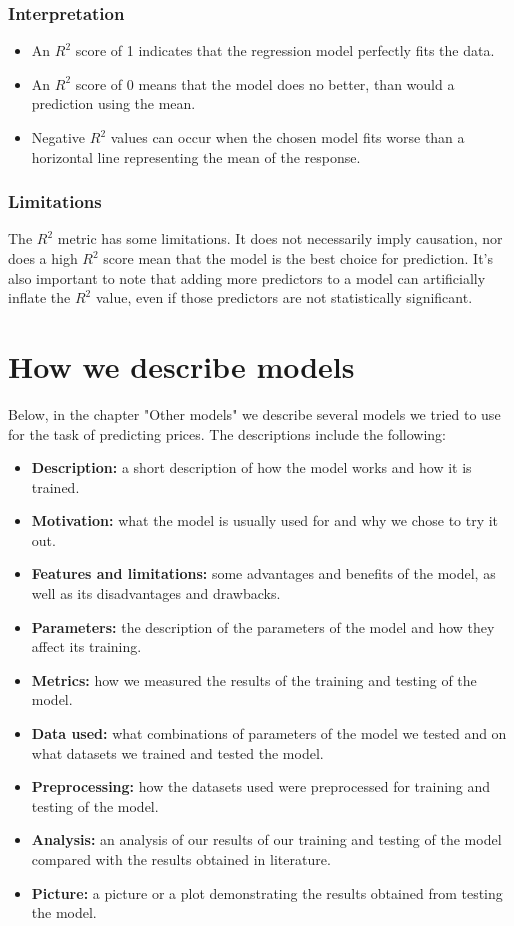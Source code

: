 \subsubsection{Interpretation}
\begin{itemize}
	\item An \(R^2\) score of 1 indicates that the regression model perfectly fits the data.
	\item An \(R^2\) score of 0 means that the model does no better, than would a prediction using the mean.
	\item Negative \(R^2\) values can occur when the chosen model fits worse than a horizontal line representing the mean of the response.
\end{itemize}

\subsubsection{Limitations}
The \(R^2\) metric has some limitations. It does not necessarily imply causation, nor does a high \(R^2\) score mean that the model is the best choice for prediction. It's also important to note that adding more predictors to a model can artificially inflate the \(R^2\) value, even if those predictors are not statistically significant.


\section{How we describe models}
Below, in the chapter "Other models" we describe several models we tried to use for the task of predicting prices. The descriptions include the following:
\begin{itemize}
	\item \textbf{Description:} a short description of how the model works and how it is trained.
	\item \textbf{Motivation:} what the model is usually used for and why we chose to try it out.
	\item \textbf{Features and limitations:} some advantages and benefits of the model, as well as its disadvantages and drawbacks.
	\item \textbf{Parameters:} the description of the parameters of the model and how they affect its training.
	\item \textbf{Metrics:} how we measured the results of the training and testing of the model.
	\item \textbf{Data used:} what combinations of parameters of the model we tested and on what datasets we trained and tested the model.
	\item \textbf{Preprocessing:} how the datasets used were preprocessed for training and testing of the model.
	\item \textbf{Analysis:} an analysis of our results of our training and testing of the model compared with the results obtained in literature.
	\item \textbf{Picture:} a picture or a plot demonstrating the results obtained from testing the model.
\end{itemize}

